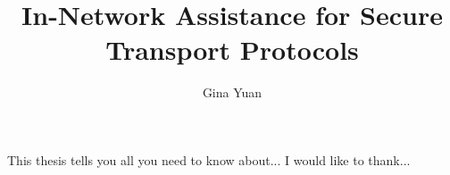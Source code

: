 \documentclass{report}
\begin{document}
\title{In-Network Assistance for Secure Transport Protocols}
\author{Gina Yuan}
 
\beforepreface
{}
This thesis tells you all you need to know about...
I would like to thank...
\afterpreface








% 


\end{document}
